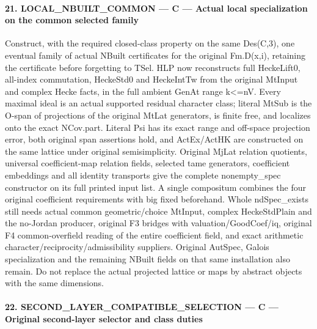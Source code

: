 \paragraph{21. LOCAL\_\allowbreak NBUILT\_\allowbreak COMMON — C — Actual local specialization on the common selected family}

Construct, with the required closed-class property on the same Des(C,3), one eventual family of actual NBuilt certificates for the original Fm.D(x,i), retaining the certificate before forgetting to TSel. HLP now reconstructs full HeckeLift0, all-index commutation, HeckeStd0 and HeckeIntTw from the original MtInput and complex Hecke facts, in the full ambient GenAt range k<=nV. Every maximal ideal is an actual supported residual character class; literal MtSub is the O-span of projections of the original MtLat generators, is finite free, and localizes onto the exact NCov.part. Literal Psi has its exact range and off-space projection error, both original span assertions hold, and ActEx/ActHK are constructed on the same lattice under original semisimplicity. Original MjLat relation quotients, universal coefficient-map relation fields, selected tame generators, coefficient embeddings and all identity transports give the complete nonempty\_\allowbreak spec constructor on its full printed input list. A single compositum combines the four original coefficient requirements with big fixed beforehand. Whole ndSpec\_\allowbreak exists still needs actual common geometric/choice MtInput, complex HeckeStdPlain and the no-Jordan producer, original F3 bridges with valuation/GoodCoef/iq, original F4 common-overfield reading of the entire coefficient field, and exact arithmetic character/reciprocity/admissibility suppliers. Original AutSpec, Galois specialization and the remaining NBuilt fields on that same installation also remain. Do not replace the actual projected lattice or maps by abstract objects with the same dimensions.



\paragraph{22. SECOND\_\allowbreak LAYER\_\allowbreak COMPATIBLE\_\allowbreak SELECTION — C — Original second-layer selector and class duties}

